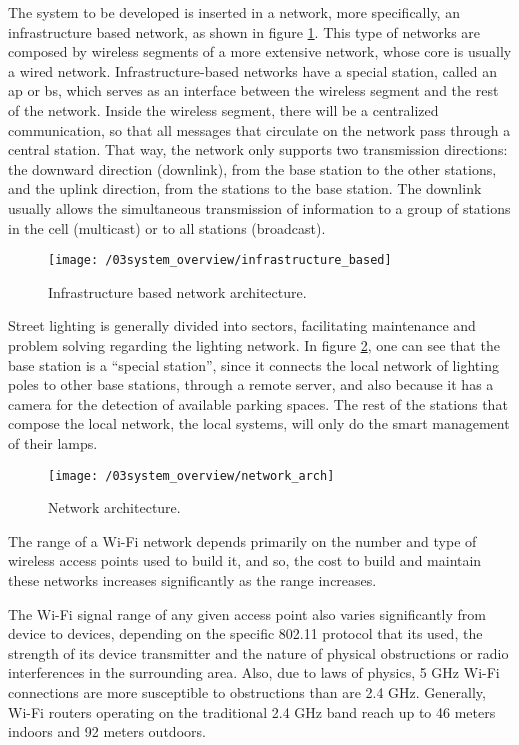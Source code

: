 The system to be developed is inserted in a network, more specifically, an infrastructure based network, as shown in figure \ref{fig:infr_based_arch}. This type of networks are composed by wireless segments of a more extensive network, whose core is usually a wired network. Infrastructure-based networks have a special station, called an \ac{ap} or \ac{bs}, which serves as an interface between the wireless segment and the rest of the network. Inside the wireless segment, there will be a centralized communication, so that all messages that circulate on the network pass through a central station. That way, the network only supports two transmission directions: the downward direction (downlink), from the base station to the other stations, and the uplink direction, from the stations to the base station. The downlink usually allows the simultaneous transmission of information to a group of stations in the cell (multicast) or to all stations (broadcast).

\begin{figure}[ht]
	\centering
	\texttt{[image: /03system\_overview/infrastructure\_based]}
	\caption{Infrastructure based network architecture.}
	\label{fig:infr_based_arch}
\end{figure}

Street lighting is generally divided into sectors, facilitating maintenance and problem solving regarding the lighting network. In figure \ref{fig:network_arch}, one can see that the base station is a “special station”, since it connects the local network of lighting poles to other base stations, through a remote server, and also because it has a camera for the detection of available parking spaces. The rest of the stations that compose the local network, the local systems, will only do the smart management of their lamps.

\begin{figure}[ht]
	\centering
	\texttt{[image: /03system\_overview/network\_arch]}
	\caption{Network architecture.}
	\label{fig:network_arch}
\end{figure}

The range of a Wi-Fi network depends primarily on the number and type of wireless access points used to build it, and so, the cost to build and maintain these networks increases significantly as the range increases.

The Wi-Fi signal range of any given access point also varies significantly from device to devices, depending on the specific 802.11 protocol that its used, the strength of its device transmitter and the nature of physical obstructions or radio interferences in the surrounding area. Also, due to laws of physics, 5 GHz Wi-Fi connections are more susceptible to obstructions than are 2.4 GHz. Generally, Wi-Fi routers operating on the traditional 2.4 GHz band reach up to 46 meters indoors and 92 meters outdoors. \cite{wi_fi_range}

